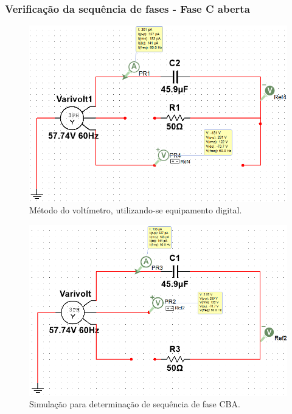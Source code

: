 \documentclass[a4paper,12pt,oneside,openany,table,xcdraw]{article}
\begin{document}
\subsubsection{Verificação da sequência de fases - Fase C aberta}
\begin{figure}[H]
\centering
\includegraphics[width=13cm]{m3-sim-abc}
\caption{Método do voltímetro, utilizando-se equipamento digital.}
\label{m3:sim:abc}
\end{figure}

\vspace{0.2cm}
\begin{figure}[H]
\centering
\includegraphics[width=13cm]{m3-sim-cba}
\caption{Simulação para determinação de sequência de fase CBA.}
\label{m3:sim:cba}
\end{figure}

\vspace{2cm}
\end{document}
